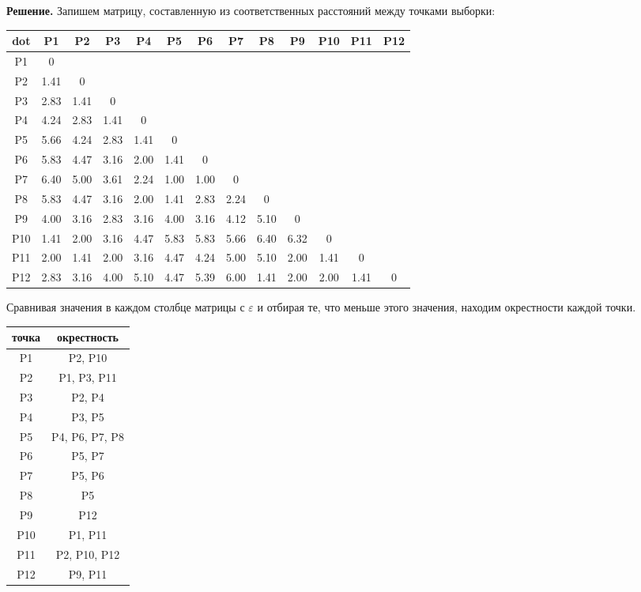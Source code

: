 \textbf{Решение.}
Запишем матрицу, составленную из соответственных расстояний между точками выборки:
\begin{center}
\begin{tabular}{ |c|c|c|c|c|c|c|c|c|c|c|c|c|} 
 \hline
dot & P1 & P2 & P3 & P4 & P5 & P6 & P7 & P8 & P9 & P10 & P11 & P12 \\ \hline
P1 & 0 &  &  &  &  &  &  &  &  &  &  &   \\ \hline
P2 & 1.41 & 0 &  &  &  &  &  &  &  &  &  &   \\ \hline
P3 & 2.83 & 1.41 & 0 &  &  &  &  &  &  &  &  &   \\ \hline
P4 & 4.24 & 2.83 & 1.41 & 0 &  &  &  &  &  &  &  &   \\ \hline
P5 & 5.66 & 4.24 & 2.83 & 1.41 & 0 &  &  &  &  &  &  &   \\ \hline
P6 & 5.83 & 4.47 & 3.16 & 2.00 & 1.41 & 0 &  &  &  &  &  &   \\ \hline
P7 & 6.40 & 5.00 & 3.61 & 2.24 & 1.00 & 1.00 & 0 &  &  &  &  &   \\ \hline
P8 & 5.83 & 4.47 & 3.16 & 2.00 & 1.41 & 2.83 & 2.24 & 0 &  &  &  &   \\ \hline
P9 & 4.00 & 3.16 & 2.83 & 3.16 & 4.00 & 3.16 & 4.12 & 5.10 & 0 &  &  &   \\ \hline
P10& 1.41 & 2.00 & 3.16 & 4.47 & 5.83 & 5.83 & 5.66 & 6.40 & 6.32 & 0 &  &   \\ \hline
P11& 2.00 & 1.41 & 2.00 & 3.16 & 4.47 & 4.24 & 5.00 & 5.10 & 2.00 & 1.41 & 0 &   \\ \hline
P12& 2.83 & 3.16 & 4.00 & 5.10 & 4.47 & 5.39 & 6.00 & 1.41 & 2.00 & 2.00 & 1.41 & 0  \\ \hline
\end{tabular}
\end{center}
Сравнивая значения в каждом столбце матрицы с $\varepsilon$ и отбирая те, что меньше этого значения, находим окрестности каждой точки.

\begin{center}
\begin{tabular}{ |c|c| } 
 \hline
 точка & окрестность \\\hline
 P1 & P2, P10\\ 
 P2 & P1, P3, P11\\ 
 P3 & P2, P4\\ 
 P4 & P3, P5\\
 P5 & P4, P6, P7, P8\\
 P6 & P5, P7\\
 P7 & P5, P6\\
 P8 & P5\\
 P9 & P12\\
 P10 & P1, P11\\
 P11 & P2, P10, P12\\
 P12 & P9, P11\\
 \hline
\end{tabular}
\end{center}

